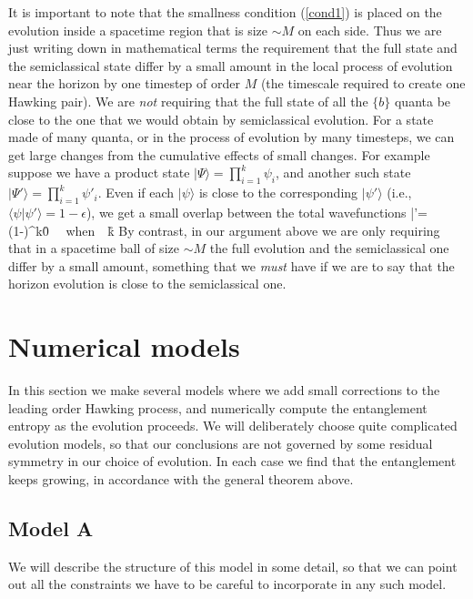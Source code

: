 \documentclass[11pt]{article}
\begin{document}
It is important to note that the smallness condition (\ref{cond1}) is placed on the evolution inside a spacetime region that is size $\sim M$ on each side. Thus we are just writing down in mathematical terms the requirement that the full state and the semiclassical state differ by a small amount in the local process of evolution near the horizon by one timestep of order $M$ (the timescale required to create one Hawking pair). We are {\it not} requiring that the full state of all the $\{b\}$ quanta be close to the one that we would obtain by semiclassical evolution. For a state made of many quanta, or in the process of evolution by many timesteps, we can get large changes from the cumulative effects of small changes. For example suppose we have a product state $|\Psi\rangle=\prod_{i=1}^k \psi_i$, and another such state $|\Psi'\rangle=\prod_{i=1}^k\psi'_i$. Even if each $|\psi\rangle$ is close to the corresponding $|\psi'\rangle$ (i.e., $\langle\psi|\psi'\rangle=1-\epsilon$), we get a small overlap between the total wavefunctions
\be
\langle \Psi|\Psi'\rangle=(1-\epsilon)^k\r 0 ~~{\rm when}~~k\r \infty
\ee
By contrast, in our argument above we are only requiring that in a spacetime ball of size $\sim M$ the full evolution and the semiclassical one differ by a small amount, something that we {\it must} have if we are to say that the horizon evolution is close to the semiclassical one.  



\section{Numerical models}
\label{secthree}\setcounter{equation}{0}

In this section we make several models where we add small corrections to the leading order Hawking process, and numerically compute the entanglement entropy as the evolution proceeds. We will deliberately choose quite complicated evolution models, so that our conclusions are not governed by some residual symmetry in our choice of evolution.   In each case we find that the entanglement keeps growing, in accordance with the general theorem above.


\subsection{Model A}

We will describe the structure of this model in some detail, so that we can point out all the constraints we have to be careful to incorporate in any such model. 
\end{document}
